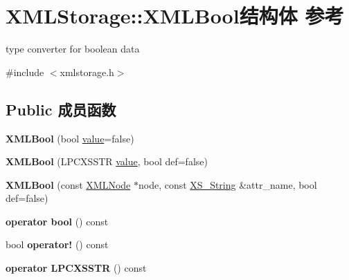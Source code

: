 \hypertarget{struct_x_m_l_storage_1_1_x_m_l_bool}{}\section{X\+M\+L\+Storage\+:\+:X\+M\+L\+Bool结构体 参考}
\label{struct_x_m_l_storage_1_1_x_m_l_bool}


type converter for boolean data  




{\ttfamily \#include $<$xmlstorage.\+h$>$}

\subsection*{Public 成员函数}
\begin{DoxyCompactItemize}
\item 
\mbox{\label{struct_x_m_l_storage_1_1_x_m_l_bool_a08d1a94603c6ce9be0d4e2abec8596e8}} 
{\bfseries X\+M\+L\+Bool} (bool \hyperlink{unionvalue}{value}=false)
\item 
\mbox{\label{struct_x_m_l_storage_1_1_x_m_l_bool_a9ecf3bbb1ee0190979193a96dfc5a08f}} 
{\bfseries X\+M\+L\+Bool} (L\+P\+C\+X\+S\+S\+TR \hyperlink{unionvalue}{value}, bool def=false)
\item 
\mbox{\label{struct_x_m_l_storage_1_1_x_m_l_bool_aa1d368aa1cda16700f375be1cecc5eda}} 
{\bfseries X\+M\+L\+Bool} (const \hyperlink{struct_x_m_l_storage_1_1_x_m_l_node}{X\+M\+L\+Node} $\ast$node, const \hyperlink{struct_x_m_l_storage_1_1_x_s___string}{X\+S\+\_\+\+String} \&attr\+\_\+name, bool def=false)
\item 
\mbox{\label{struct_x_m_l_storage_1_1_x_m_l_bool_ae53ea2715fc2e5292d697fa33ef3f457}} 
{\bfseries operator bool} () const
\item 
\mbox{\label{struct_x_m_l_storage_1_1_x_m_l_bool_aef9a18aaccdf47a17a9940e1fde2efcc}} 
bool {\bfseries operator!} () const
\item 
\mbox{\label{struct_x_m_l_storage_1_1_x_m_l_bool_afd4d2cf963685bdd1aabffeaa6fc1e31}} 
{\bfseries operator L\+P\+C\+X\+S\+S\+TR} () const
\end{DoxyCompactItemize}
